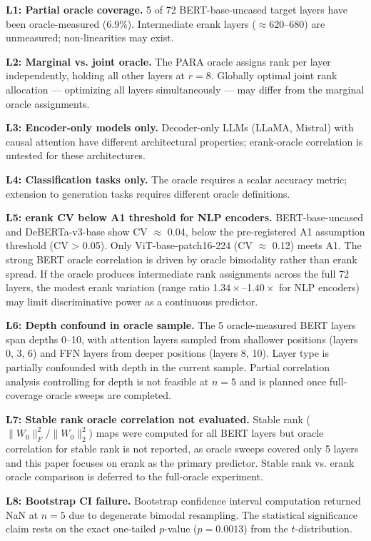 \textbf{L1: Partial oracle coverage.} 5 of 72 BERT-base-uncased target layers have been oracle-measured (6.9\%). Intermediate erank layers ($\approx 620$--680) are unmeasured; non-linearities may exist.

\textbf{L2: Marginal vs. joint oracle.} The PARA oracle assigns rank per layer independently, holding all other layers at $r = 8$. Globally optimal joint rank allocation --- optimizing all layers simultaneously --- may differ from the marginal oracle assignments.

\textbf{L3: Encoder-only models only.} Decoder-only LLMs (LLaMA, Mistral) with causal attention have different architectural properties; erank-oracle correlation is untested for these architectures.

\textbf{L4: Classification tasks only.} The oracle requires a scalar accuracy metric; extension to generation tasks requires different oracle definitions.

\textbf{L5: erank CV below A1 threshold for NLP encoders.} BERT-base-uncased and DeBERTa-v3-base show CV $\approx$ 0.04, below the pre-registered A1 assumption threshold (CV > 0.05). Only ViT-base-patch16-224 (CV $\approx$ 0.12) meets A1. The strong BERT oracle correlation is driven by oracle bimodality rather than erank spread. If the oracle produces intermediate rank assignments across the full 72 layers, the modest erank variation (range ratio 1.$34\times$--1.$40\times$ for NLP encoders) may limit discriminative power as a continuous predictor.

\textbf{L6: Depth confound in oracle sample.} The 5 oracle-measured BERT layers span depths 0--10, with attention layers sampled from shallower positions (layers 0, 3, 6) and FFN layers from deeper positions (layers 8, 10). Layer type is partially confounded with depth in the current sample. Partial correlation analysis controlling for depth is not feasible at $n = 5$ and is planned once full-coverage oracle sweeps are completed.

\textbf{L7: Stable rank oracle correlation not evaluated.} Stable rank ($\|W_0\|_F^2 / \|W_0\|_2^2$) maps were computed for all BERT layers but oracle correlation for stable rank is not reported, as oracle sweeps covered only 5 layers and this paper focuses on erank as the primary predictor. Stable rank vs. erank oracle comparison is deferred to the full-oracle experiment.

\textbf{L8: Bootstrap CI failure.} Bootstrap confidence interval computation returned NaN at $n = 5$ due to degenerate bimodal resampling. The statistical significance claim rests on the exact one-tailed $p$-value ($p = 0.0013$) from the $t$-distribution.

